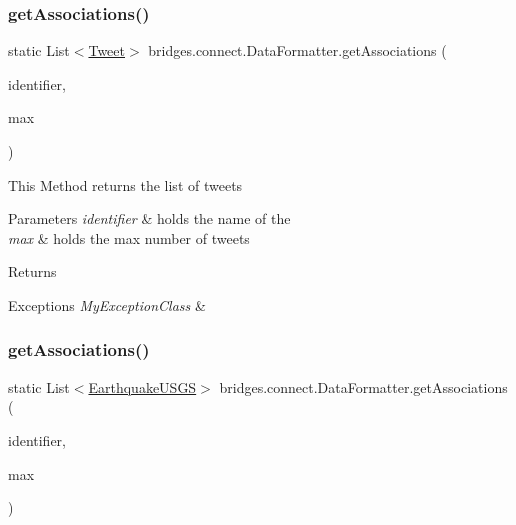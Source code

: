 \subsubsection{\texorpdfstring{get\+Associations()}{getAssociations()}\hspace{0.1cm}{\footnotesize\ttfamily [2/5]}}
{\footnotesize\ttfamily static List$<$\mbox{\hyperlink{classbridges_1_1data__src__dependent_1_1_tweet}{Tweet}}$>$ bridges.\+connect.\+Data\+Formatter.\+get\+Associations (\begin{DoxyParamCaption}\item[{\mbox{\hyperlink{classbridges_1_1data__src__dependent_1_1_twitter_account}{Twitter\+Account}}}]{identifier,  }\item[{int}]{max }\end{DoxyParamCaption})\hspace{0.3cm}{\ttfamily [static]}}

This Method returns the list of tweets 
\begin{DoxyParams}{Parameters}
{\em identifier} & holds the name of the \\
\hline
{\em max} & holds the max number of tweets \\
\hline
\end{DoxyParams}
\begin{DoxyReturn}{Returns}

\end{DoxyReturn}

\begin{DoxyExceptions}{Exceptions}
{\em My\+Exception\+Class} & \\
\hline
\end{DoxyExceptions}
\mbox{\label{classbridges_1_1connect_1_1_data_formatter_abdcbc3c914dc045cb532fae291d4f3a5}} 
\subsubsection{\texorpdfstring{get\+Associations()}{getAssociations()}\hspace{0.1cm}{\footnotesize\ttfamily [3/5]}}
{\footnotesize\ttfamily static List$<$\mbox{\hyperlink{classbridges_1_1data__src__dependent_1_1_earthquake_u_s_g_s}{Earthquake\+U\+S\+GS}}$>$ bridges.\+connect.\+Data\+Formatter.\+get\+Associations (\begin{DoxyParamCaption}\item[{\mbox{\hyperlink{classbridges_1_1data__src__dependent_1_1_u_s_g_saccount}{U\+S\+G\+Saccount}}}]{identifier,  }\item[{int}]{max }\end{DoxyParamCaption})\hspace{0.3cm}{\ttfamily [static]}}

